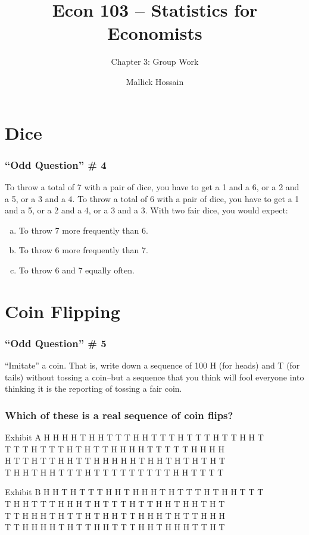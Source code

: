 \documentclass{beamer}
\title{Econ 103 -- Statistics for Economists}
\subtitle{Chapter 3: Group Work}
\author{Mallick Hossain}
\date{}
\institute{University of Pennsylvania}
\begin{document}
 

\begin{frame}
	\titlepage 
\end{frame} 

\section{Dice}
\begin{frame}
\frametitle{``Odd Question'' \# 4}
    To throw a total of 7 with a pair of dice, you have to get a 1 and a 6, or a 2 and a 5, or a 3 and a 4.
    To throw a total of 6 with a pair of dice, you have to get a 1 and a 5, or a 2 and a 4, or a 3 and a 3.
	\vspace{1em}
	With two fair dice, you would expect:
	\begin{enumerate}[(a)]
		\item To throw 7 more frequently than 6.
		\item To throw 6 more frequently than 7.
		\item To throw 6 and 7 equally often.
	\end{enumerate}
\end{frame}

\section{Coin Flipping}
\begin{frame}
\frametitle{``Odd Question'' \# 5}
	``Imitate'' a coin. That is, write down a sequence of 100 H (for heads) and T (for tails) without                                                                                                                     
	tossing a coin--but a sequence that you think will fool everyone into thinking it is the reporting of 
	tossing a fair coin.		
\end{frame}

\begin{frame}
\frametitle{Which of these is a real sequence of coin flips?}
	\small
	\begin{block}{Exhibit A}
	H H H H T H H T T T H H T T T H T T T H T T H H T \\
	T T T H T T T H T H T T H H H H T T T T T H H H H \\
	H T T H T T H H T T H H H H H T H H T H T H T H T \\
	T H H T H H T T T H T T T T T T T T T H H T T T T 
	\end{block}
	
	\begin{block}{Exhibit B}
	H H T H T T T H H T H H H T H T T T H T H H T T T\\
	T H H T T T H H H T H T T T H T T H H T H H T H T\\
	T T H H H T H T T H T H H T	T H H H T H T T H H H\\
	T T H H H H T H T T H H T T T H H T H H H T T H T
	\end{block}
\end{frame}
\end{document}
